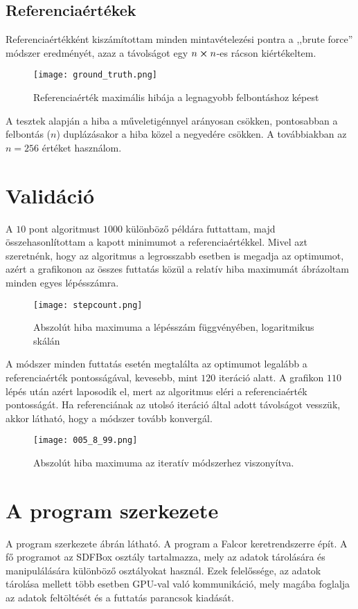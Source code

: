 \subsection{Referenciaértékek}
Referenciaértékként kiszámítottam minden mintavételezési pontra a ,,brute force'' módszer eredményét, azaz a távolságot egy $n\cross n$-es rácson kiértékeltem.
\begin{figure}[H]
	\centering
	\texttt{[image: ground\_truth.png]}
	\caption{Referenciaérték maximális hibája a legnagyobb felbontáshoz képest}
\end{figure}
A tesztek alapján a hiba a műveletigénnyel arányosan csökken, pontosabban a felbontás ($n$) duplázásakor a hiba közel a negyedére csökken. A továbbiakban az $n=256$ értéket használom.



\section{Validáció}

A $10$ pont algoritmust $1000$ különböző példára futtattam, majd összehasonlítottam a kapott minimumot a referenciaértékkel. Mivel azt szeretnénk, hogy az algoritmus a legrosszabb esetben is megadja az optimumot, azért a grafikonon az összes futtatás közül a relatív hiba maximumát ábrázoltam minden egyes lépésszámra.
\begin{figure}[H]
	\centering
	\texttt{[image: stepcount.png]}
	\caption{Abszolút hiba maximuma a lépésszám függvényében, logaritmikus skálán}
\end{figure}
A módszer minden futtatás esetén megtalálta az optimumot legalább a referenciaérték pontosságával, kevesebb, mint $120$ iteráció alatt. A grafikon $110$ lépés után azért laposodik el, mert az algoritmus eléri a referenciaérték pontosságát. Ha referenciának az utolsó iteráció által adott távolságot vesszük, akkor látható, hogy a módszer tovább konvergál.
\begin{figure}[H]
	\centering
	\texttt{[image: 005\_8\_99.png]}
	\caption{Abszolút hiba maximuma az iteratív módszerhez viszonyítva.}
\end{figure}


\section{A program szerkezete}
A program szerkezete  ábrán látható. A program a Falcor keretrendszerre épít. A fő programot az SDFBox osztály tartalmazza, mely az adatok tárolására és manipulálására különböző osztályokat használ. Ezek felelőssége, az adatok tárolása mellett több esetben GPU-val való kommunikáció, mely magába foglalja az adatok feltöltését és a futtatás parancsok kiadását.

